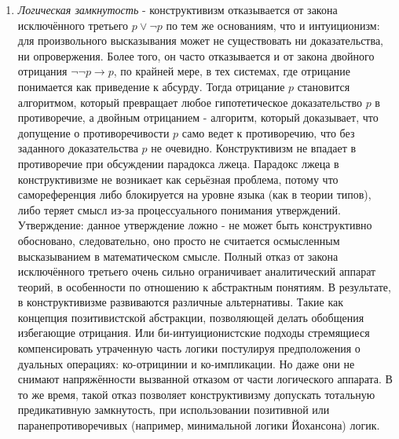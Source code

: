 \documentclass[12pt]{article}
\begin{document}
\begin{enumerate}
    \item {\it Логическая замкнутость} - конструктивизм отказывается от закона исключённого третьего $p \vee \neg p$ по тем же основаниям, что и интуиционизм: для произвольного высказывания может не существовать ни доказательства, ни опровержения. Более того, он часто отказывается и от закона двойного отрицания $\neg\neg p \to p$, по крайней мере, в тех системах, где отрицание понимается как приведение к абсурду. Тогда отрицание $p$ становится алгоритмом, который превращает любое гипотетическое доказательство $p$ в противоречие, а двойным отрицанием - алгоритм, который доказывает, что допущение о противоречивости $p$ само ведет к противоречию, что без заданного доказательства $p$ не очевидно. Конструктивизм не впадает в противоречие при обсуждении парадокса лжеца. Парадокс лжеца в конструктивизме не возникает как серьёзная проблема, потому что самореференция либо блокируется на уровне языка (как в теории типов), либо теряет смысл из-за процессуального понимания утверждений. Утверждение: данное утверждение ложно - не может быть конструктивно обосновано, следовательно, оно просто не считается осмысленным высказыванием в математическом смысле. Полный отказ от закона исключённого третьего очень сильно ограничивает аналитический аппарат теорий, в особенности по отношению к абстрактным понятиям. В результате, в конструктивизме развиваются различные альтернативы. Такие как концепция позитивистской абстракции, позволяющей делать обобщения избегающие отрицания. Или би-интуиционистские подходы стремящиеся компенсировать утраченную часть логики постулируя предположения о дуальных операциях: ко-отрицинии и ко-импликации. Но даже они не снимают напряжённости вызванной отказом от части логического аппарата. В то же время, такой отказ позволяет конструктивизму допускать тотальную предикативную замкнутость, при использовании позитивной или паранепротиворечивых (например, минимальной логики Йохансона) логик.

\end{enumerate}
\end{document}
